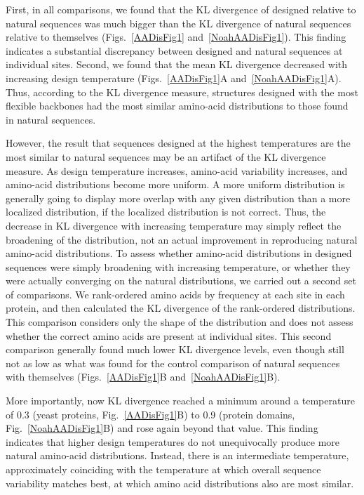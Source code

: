 \documentclass[12pt]{article}
\begin{document}
First, in all comparisons, we found that the KL divergence of designed relative to natural sequences was much bigger than the KL divergence of natural sequences relative to themselves (Figs.~\ref{AADisFig1} and~\ref{NoahAADisFig1}). This finding indicates a substantial discrepancy between designed and natural sequences at individual sites. Second, we found that the mean KL divergence decreased with increasing design temperature (Figs.~\ref{AADisFig1}A and~\ref{NoahAADisFig1}A). Thus, according to the KL divergence measure, structures designed with the most flexible backbones had the most similar amino-acid distributions to those found in natural sequences.

However, the result that sequences designed at the highest temperatures are the most similar to natural sequences may be an artifact of the KL divergence measure. As design temperature increases, amino-acid variability increases, and amino-acid distributions become more uniform. A more uniform distribution is generally going to display more overlap with any given distribution than a more localized distribution, if the localized distribution is not correct. Thus, the decrease in KL divergence with increasing temperature may simply reflect the broadening of the distribution, not an actual improvement in reproducing natural amino-acid distributions. To assess whether amino-acid distributions in designed sequences were simply broadening with increasing temperature, or whether they were actually converging on the natural distributions, we carried out a second set of comparisons. We rank-ordered amino acids by frequency at each site in each protein, and then calculated the KL divergence of the rank-ordered distributions. This comparison considers only the shape of the distribution and does not assess whether the correct amino acids are present at individual sites. This second comparison generally found much lower KL divergence levels, even though still not as low as what was found for the control comparison of natural sequences with themselves (Figs.~\ref{AADisFig1}B and~\ref{NoahAADisFig1}B). 


{\color{red} More importantly, now KL divergence reached a minimum around a temperature of 0.3
(yeast proteins, Fig.~\ref{AADisFig1}B) to 0.9 (protein domains, Fig.~\ref{NoahAADisFig1}B) and rose again beyond that value. This finding indicates that higher design temperatures do not unequivocally produce more natural amino-acid distributions. Instead, there is an intermediate temperature, approximately coinciding with the temperature at which overall sequence variability matches best, at which amino acid distributions also are most similar.}
\end{document}
